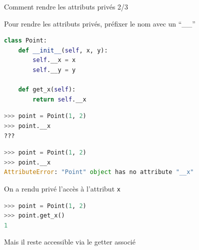 \documentclass[10pt]{beamer}
\begin{document}
\begin{frame}[fragile]{Comment rendre les attributs privés 2/3}

  Pour rendre les attributs privés, préfixer le nom avec un ``\_\_''

  \begin{lstlisting}[language=Python, numbers=none]
class Point:
    def __init__(self, x, y):
        self.__x = x
        self.__y = y

    def get_x(self):
        return self.__x
\end{lstlisting}

  \begin{overprint}





\begin{lstlisting}[language=Python, numbers=none]
>>> point = Point(1, 2)
>>> point.__x
???
\end{lstlisting}




\begin{lstlisting}[language=Python, numbers=none]
>>> point = Point(1, 2)
>>> point.__x
AttributeError: "Point" object has no attribute "__x"
\end{lstlisting}
  On a rendu privé l'accès à l'attribut \texttt{x}

\begin{lstlisting}[language=Python, numbers=none]
>>> point = Point(1, 2)
>>> point.get_x()
1
\end{lstlisting}
  Mais il reste accessible via le getter associé

  \end{overprint}

    \end{frame}
\end{document}
